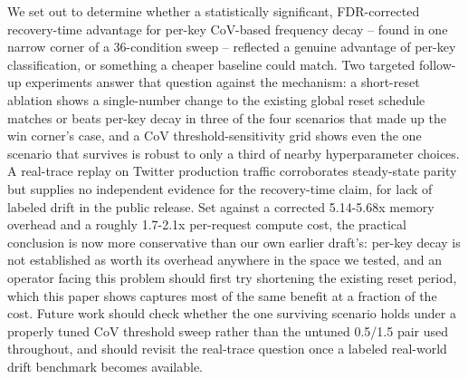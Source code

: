 \documentclass[11pt,letterpaper]{article}
\begin{document}
We set out to determine whether a statistically significant, FDR-corrected recovery-time advantage for per-key CoV-based frequency decay -- found in one narrow corner of a 36-condition sweep -- reflected a genuine advantage of per-key classification, or something a cheaper baseline could match. Two targeted follow-up experiments answer that question against the mechanism: a short-reset ablation shows a single-number change to the existing global reset schedule matches or beats per-key decay in three of the four scenarios that made up the win corner's case, and a CoV threshold-sensitivity grid shows even the one scenario that survives is robust to only a third of nearby hyperparameter choices. A real-trace replay on Twitter production traffic corroborates steady-state parity but supplies no independent evidence for the recovery-time claim, for lack of labeled drift in the public release. Set against a corrected 5.14-5.68x memory overhead and a roughly 1.7-2.1x per-request compute cost, the practical conclusion is now more conservative than our own earlier draft's: per-key decay is not established as worth its overhead anywhere in the space we tested, and an operator facing this problem should first try shortening the existing reset period, which this paper shows captures most of the same benefit at a fraction of the cost. Future work should check whether the one surviving scenario holds under a properly tuned CoV threshold sweep rather than the untuned 0.5/1.5 pair used throughout, and should revisit the real-trace question once a labeled real-world drift benchmark becomes available.



\end{document}
